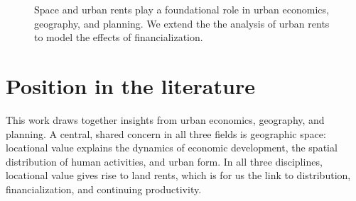 \begin{figure}[!ht]

\caption[Linking space and urban rents to the effects of financialization.]{Space and urban rents play a foundational role in urban economics, geography, and planning. We extend the the analysis of urban rents to model the effects of financialization.}
\label{fig-fields}
\end{figure}

\section{Position in the literature}
This work draws together insights from urban economics, geography, and planning. A central, shared concern in all three fields is geographic space: locational value explains the dynamics of economic development, the spatial distribution of human activities, and urban form.  
In all three disciplines, locational value gives rise to land rents, which is for us the link to distribution, financialization, and continuing productivity.  

